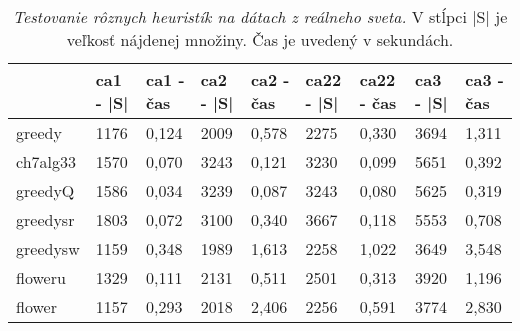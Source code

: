 \begin{table}[h]
	\centering
	\begin{tabular}{lllllllll}
		\hline
		         & ca1 - |S| & ca1 - čas & ca2 - |S| & ca2 - čas & ca22 - |S| & ca22 - čas & ca3 - |S| & ca3 - čas \\ \hline
		greedy   & 1176      & 0,124     & 2009      & 0,578     & 2275       & 0,330      & 3694      & 1,311     \\
		ch7alg33 & 1570      & 0,070     & 3243      & 0,121     & 3230       & 0,099      & 5651      & 0,392     \\
		greedyQ  & 1586      & 0,034     & 3239      & 0,087     & 3243       & 0,080      & 5625      & 0,319     \\
		greedysr & 1803      & 0,072     & 3100      & 0,340     & 3667       & 0,118      & 5553      & 0,708     \\
		greedysw & 1159      & 0,348     & 1989      & 1,613     & 2258       & 1,022      & 3649      & 3,548     \\
		floweru  & 1329      & 0,111     & 2131      & 0,511     & 2501       & 0,313      & 3920      & 1,196     \\
		flower   & 1157      & 0,293     & 2018      & 2,406     & 2256       & 0,591      & 3774      & 2,830     \\ \hline
	\end{tabular}
	\caption{\emph{Testovanie rôznych heuristík na dátach z reálneho sveta.} %
		V stĺpci |S| je veľkosť nájdenej množiny. Čas je uvedený v sekundách.}
	\label{table:real}
\end{table}

